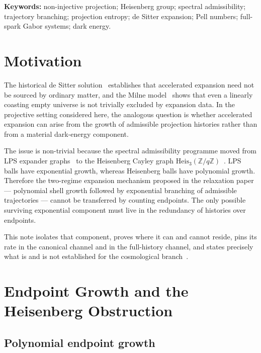 \documentclass[11pt]{article}
\newcommand{\Heis}{\mathrm{Heis}_3}
\newcommand{\Zq}{\mathbb{Z}/q\mathbb{Z}}
\begin{document}
\medskip
\noindent\textbf{Keywords:} non-injective projection; Heisenberg group; spectral admissibility;
trajectory branching; projection entropy; de Sitter expansion; Pell numbers; full-spark Gabor systems;
dark energy.

\newpage
\tableofcontents

\newpage
\section{Motivation}
\label{sec:motivation}

The historical de Sitter solution~\cite{deSitter1917} establishes that accelerated expansion need not be
sourced by ordinary matter, and the Milne model~\cite{Milne1935} shows that even a linearly coasting empty
universe is not trivially excluded by expansion data.
In the projective setting considered here, the analogous question is whether accelerated expansion can arise
from the growth of admissible projection histories rather than from a material dark-energy component.

The issue is non-trivial because the spectral admissibility programme moved from LPS expander
graphs~\cite{Lubotzky1988,Beau2026a5} to the Heisenberg Cayley graph
$\Heis(\Zq)$~\cite{Beau2026a16,Beau2026a20}.
LPS balls have exponential growth, whereas Heisenberg balls have polynomial growth.
Therefore the two-regime expansion mechanism proposed in the relaxation paper~\cite{Beau2026a5} --- polynomial
shell growth followed by exponential branching of admissible trajectories --- cannot be transferred by
counting endpoints.
The only possible surviving exponential component must live in the redundancy of histories over endpoints.

This note isolates that component, proves where it can and cannot reside, pins its rate in the canonical
channel and in the full-history channel, and states precisely what is and is not established for the
cosmological branch~\cite{Beau2026d,Cosmochrony}.

\section{Endpoint Growth and the Heisenberg Obstruction}
\label{sec:endpoint}

\subsection{Polynomial endpoint growth}
\label{sec:bass-guivarch}
\end{document}
